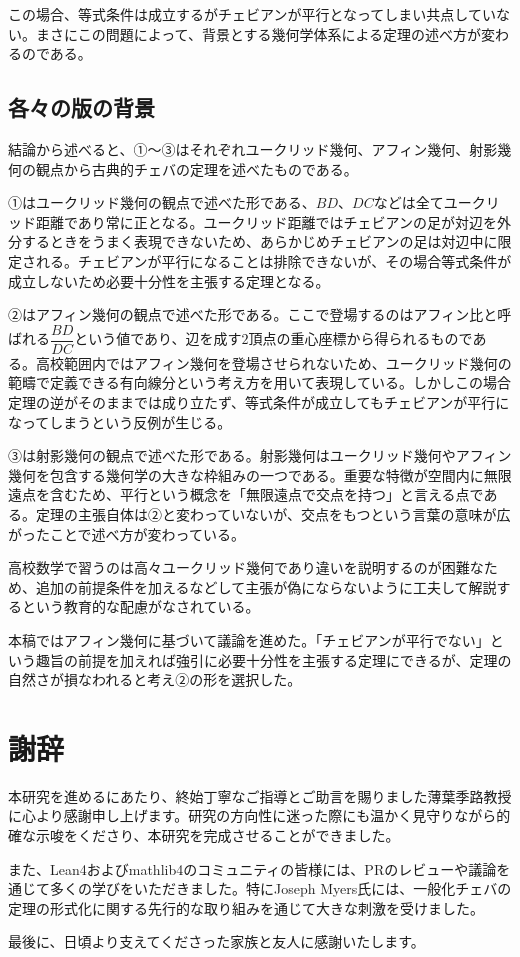 \documentclass[a4paper,12pt]{bxjsbook}
\newlength{\customindent}
\newenvironment{body}{
  \par
  \begingroup
  \setlength{\leftskip}{\customindent}
  \setlength{\rightskip}{0pt}
  \setlength{\parindent}{1em}
  \setlength{\displayindent}{\customindent}
  \setlength{\displaywidth}{\dimexpr\linewidth-\customindent\relax}
}{
  \par
  \endgroup
}
\theoremstyle{theorem}
\newcommand{\addchaptertotoc}[1]{%
  \chapter*{#1}%
  \addcontentsline{toc}{chapter}{#1}%
}
\begin{document}
    \begin{body}
        \indent この場合、等式条件は成立するがチェビアンが平行となってしまい共点していない。まさにこの問題によって、背景とする幾何学体系による定理の述べ方が変わるのである。
    \end{body}

    \section{各々の版の背景}

    \begin{body}
        \indent 結論から述べると、①〜③はそれぞれユークリッド幾何、アフィン幾何、射影幾何の観点から古典的チェバの定理を述べたものである。

        \indent ①はユークリッド幾何の観点で述べた形である、$BD$、$DC$などは全てユークリッド距離であり常に正となる。ユークリッド距離ではチェビアンの足が対辺を外分するときをうまく表現できないため、あらかじめチェビアンの足は対辺中に限定される。チェビアンが平行になることは排除できないが、その場合等式条件が成立しないため必要十分性を主張する定理となる。

        \indent ②はアフィン幾何の観点で述べた形である。ここで登場するのはアフィン比と呼ばれる$\dfrac{BD}{DC}$という値であり、辺を成す$2$頂点の重心座標から得られるものである。高校範囲内ではアフィン幾何を登場させられないため、ユークリッド幾何の範疇で定義できる有向線分という考え方を用いて表現している。しかしこの場合定理の逆がそのままでは成り立たず、等式条件が成立してもチェビアンが平行になってしまうという反例が生じる。

        \indent ③は射影幾何の観点で述べた形である。射影幾何はユークリッド幾何やアフィン幾何を包含する幾何学の大きな枠組みの一つである。重要な特徴が空間内に無限遠点を含むため、平行という概念を「無限遠点で交点を持つ」と言える点である。定理の主張自体は②と変わっていないが、交点をもつという言葉の意味が広がったことで述べ方が変わっている。

        \indent 高校数学で習うのは高々ユークリッド幾何であり違いを説明するのが困難なため、追加の前提条件を加えるなどして主張が偽にならないように工夫して解説するという教育的な配慮がなされている。

        \indent 本稿ではアフィン幾何に基づいて議論を進めた。「チェビアンが平行でない」という趣旨の前提を加えれば強引に必要十分性を主張する定理にできるが、定理の自然さが損なわれると考え②の形を選択した。
    \end{body}

    \backmatter
    \addchaptertotoc{謝辞}
    \begin{body}
        \indent 本研究を進めるにあたり、終始丁寧なご指導とご助言を賜りました薄葉季路教授に心より感謝申し上げます。研究の方向性に迷った際にも温かく見守りながら的確な示唆をくださり、本研究を完成させることができました。

        \indent また、Lean4およびmathlib4のコミュニティの皆様には、PRのレビューや議論を通じて多くの学びをいただきました。特にJoseph Myers氏には、一般化チェバの定理の形式化に関する先行的な取り組みを通じて大きな刺激を受けました。

        \indent 最後に、日頃より支えてくださった家族と友人に感謝いたします。
    \end{body}
\end{document}
